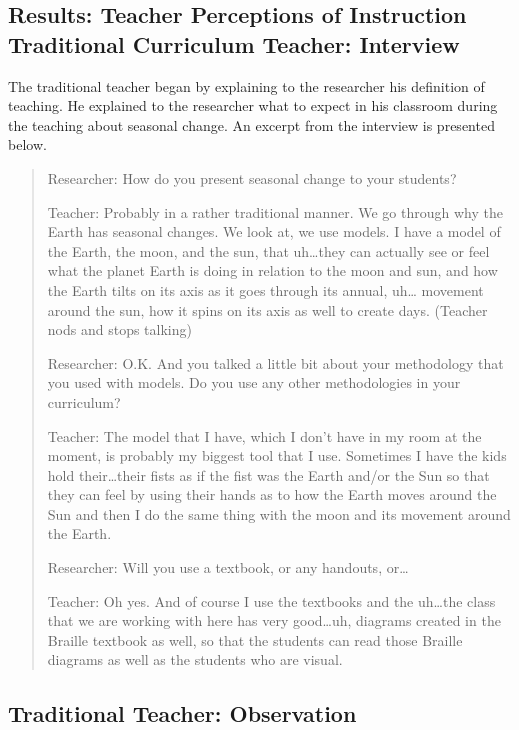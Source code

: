 \documentclass[11.5pt]{sig-alternate} %
\begin{document}
\begin{large}
\subsection*{Results: Teacher Perceptions of Instruction \\
Traditional Curriculum Teacher: Interview}

The traditional teacher began by explaining to the researcher his definition of teaching.  He explained to the researcher what to expect in his classroom during the teaching about seasonal change.  An excerpt from the interview is presented below. 

\begin{quote}
Researcher: How do you present seasonal change to your students?

Teacher: Probably in a rather traditional manner.  We go through why the Earth has seasonal changes. We look at, we use models. I have a model of the Earth, the moon, and the sun, that uh…they can actually see or feel what the planet Earth is doing in relation to the moon and sun, and how the Earth tilts on its axis as it goes through its annual, uh… movement around the sun, how it spins on its axis as well to create days.  (Teacher nods and stops talking)

Researcher: O.K. And you talked a little bit about your methodology that you used with models. Do you use any other methodologies in your curriculum?

Teacher: The model that I have, which I don’t have in my room at the moment, is probably my biggest tool that I use.   Sometimes I have the kids hold their…their fists as if the fist was the Earth and/or the Sun so that they can feel by using their hands as to how the Earth moves around the Sun and then I do the same thing with the moon and its movement around the Earth.  

Researcher:  Will you use a textbook, or any handouts, or…

Teacher: Oh yes.  And of course I use the textbooks and the uh…the class that we are working with here has very good…uh, diagrams created in the Braille textbook as well, so that the students can read those Braille diagrams as well as the students who are visual.
\end{quote}
 
\subsection*{Traditional Teacher: Observation}


\end{large}
\end{document}
